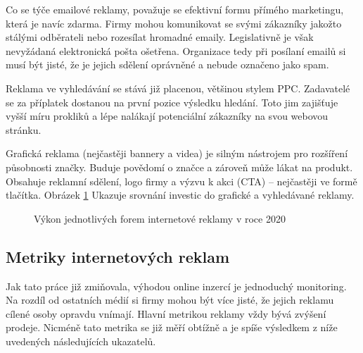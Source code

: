 Co se týče emailové reklamy, považuje se efektivní formu přímého marketingu, která je navíc zdarma.
Firmy mohou komunikovat se svými zákazníky jakožto stálými odběrateli nebo rozesílat hromadné emaily. Legislativně je však nevyžádaná elektronická pošta ošetřena.
Organizace tedy při posílaní emailů si musí být jisté, že je jejich sdělení oprávněné a nebude označeno jako spam.

Reklama ve vyhledávání se stává již placenou, většinou stylem PPC. Zadavatelé se za příplatek dostanou na první pozice výsledku hledání.
Toto jim zajišťuje vyšší míru prokliků a lépe nalákají potenciální zákazníky na svou webovou stránku. 

Grafická reklama (nejčastěji bannery a videa) je silným nástrojem pro rozšíření působnosti značky. Buduje povědomí o značce a
zároveň může lákat na produkt. Obsahuje reklamní sdělení, logo firmy a výzvu k akci (CTA) -- nejčastěji ve formě tlačítka.
Obrázek \ref{fig:spir-ad-performance} Ukazuje srovnání investic do grafické a vyhledávané reklamy.

\begin{figure}[h]
    \centering
    \caption[Výkon reklam v roce 2020]{Výkon jednotlivých forem internetové reklamy v roce 2020 \cite{spir:mediatypes}}
    \label{fig:spir-ad-performance}
\end{figure}

    \subsection{Metriky internetových reklam}\label{ssec:online-ad-metrics}
    Jak tato práce již zmiňovala, výhodou online inzercí je jednoduchý monitoring. Na rozdíl od ostatních médií si firmy mohou být více jisté,
    že jejich reklamu cílené osoby opravdu vnímají. Hlavní metrikou reklamy vždy bývá zvýšení prodeje.
    Nicméně tato metrika se již měří obtížně a je spíše výsledkem z níže uvedených následujících ukazatelů.

